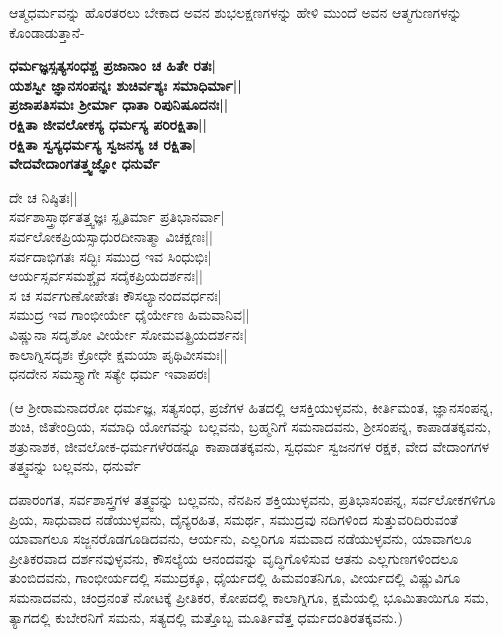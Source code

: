 ಆತ್ಮಧರ್ಮವನ್ನು ಹೊರತರಲು ಬೇಕಾದ ಅವನ ಶುಭಲಕ್ಷಣಗಳನ್ನು ಹೇಳಿ ಮುಂದೆ ಅವನ ಆತ್ಮಗುಣಗಳನ್ನು ಕೊಂಡಾಡುತ್ತಾನೆ- 


\begin{center} 

{\bf ಧರ್ಮಜ್ಞಸ್ಸತ್ಯಸಂಧಶ್ಚ ಪ್ರಜಾನಾಂ ಚ ಹಿತೇ ರತಃ|\\ 

ಯಶಸ್ವೀ ಜ್ಞಾನಸಂಪನ್ನಃ ಶುಚಿರ್ವಶ್ಯಃ ಸಮಾಧಿರ್ಮಾ||\\ 

ಪ್ರಜಾಪತಿಸಮಃ ಶ್ರೀರ್ಮಾ ಧಾತಾ ರಿಪುನಿಷೂದನಃ||\\ 

ರಕ್ಷಿತಾ ಜೀವಲೋಕಸ್ಯ ಧರ್ಮಸ್ಯ ಪರಿರಕ್ಷಿತಾ||\\ 

ರಕ್ಷಿತಾ ಸ್ವಸ್ಯಧರ್ಮಸ್ಯ ಸ್ವಜನಸ್ಯ ಚ ರಕ್ಷಿತಾ|\\ 

ವೇದವೇದಾಂಗತತ್ತ್ವಜ್ಞೋ ಧನುರ್ವೆ

ದೇ ಚ ನಿಷ್ಠಿತಃ||\\ 

ಸರ್ವಶಾಸ್ತ್ರಾರ್ಥತತ್ತ್ವಜ್ಞಃ ಸ್ಪೃತಿರ್ಮಾ ಪ್ರತಿಭಾನರ್ವಾ|\\ 

ಸರ್ವಲೋಕಪ್ರಿಯಸ್ಸಾಧುರದೀನಾತ್ಮಾ ವಿಚಕ್ಷಣಃ||\\ 

ಸರ್ವದಾಭಿಗತಃ ಸದ್ಭಿಃ ಸಮುದ್ರ ಇವ ಸಿಂಧುಭಿಃ|\\ 

ಆರ್ಯಸ್ಸರ್ವಸಮಶ್ಚೈವ ಸದೈಕಪ್ರಿಯದರ್ಶನಃ||\\ 

ಸ ಚ ಸರ್ವಗುಣೋಪೇತಃ ಕೌಸಲ್ಯಾನಂದವರ್ಧನಃ|\\ 

ಸಮುದ್ರ ಇವ ಗಾಂಭೀರ್ಯೇ ಧೈರ್ಯೇಣ ಹಿಮವಾನಿವ||\\ 

ವಿಷ್ಣುನಾ ಸದೃಶೋ ವೀರ್ಯೇ ಸೋಮವತ್ಪ್ರಿಯದರ್ಶನಃ|\\ 

ಕಾಲಾಗ್ನಿಸದೃಶಃ ಕ್ರೋಧೇ ಕ್ಷಮಯಾ ಪೃಥಿವೀಸಮಃ||\\ 

ಧನದೇನ ಸಮಸ್ತ್ಯಾಗೇ ಸತ್ಯೇ ಧರ್ಮ ಇವಾಪರಃ|} 

\end{center} 


(ಆ ಶ್ರೀರಾಮನಾದರೋ ಧರ್ಮಜ್ಞ, ಸತ್ಯಸಂಧ, ಪ್ರಜೆಗಳ ಹಿತದಲ್ಲಿ ಆಸಕ್ತಿಯುಳ್ಳವನು, ಕೀರ್ತಿಮಂತ, ಜ್ಞಾನಸಂಪನ್ನ, ಶುಚಿ, ಜಿತೇಂದ್ರಿಯ, ಸಮಾಧಿ ಯೋಗವನ್ನು ಬಲ್ಲವನು, ಬ್ರಹ್ಮನಿಗೆ ಸಮನಾದವನು, ಶ್ರೀಸಂಪನ್ನ, ಕಾಪಾಡತಕ್ಕವನು, ಶತ್ರುನಾಶಕ, ಜೀವಲೋಕ-ಧರ್ಮಗಳೆರಡನ್ನೂ ಕಾಪಾಡತಕ್ಕವನು, ಸ್ವಧರ್ಮ ಸ್ವಜನಗಳ ರಕ್ಷಕ, ವೇದ ವೇದಾಂಗಗಳ ತತ್ತ್ವವನ್ನು ಬಲ್ಲವನು, ಧನುರ್ವೆ

ದಪಾರಂಗತ, ಸರ್ವಶಾಸ್ತ್ರಗಳ ತತ್ತ್ವವನ್ನು ಬಲ್ಲವನು, ನೆನಪಿನ ಶಕ್ತಿಯುಳ್ಳವನು, ಪ್ರತಿಭಾಸಂಪನ್ನ, ಸರ್ವಲೋಕಗಳಿಗೂ ಪ್ರಿಯ, ಸಾಧುವಾದ ನಡೆಯುಳ್ಳವನು, ದೈನ್ಯರಹಿತ, ಸಮರ್ಥ, ಸಮುದ್ರವು ನದಿಗಳಿಂದ ಸುತ್ತುವರಿದಿರುವಂತೆ ಯಾವಾಗಲೂ ಸಜ್ಜನರೊಡಗೂಡಿದವನು, ಆರ್ಯನು, ಎಲ್ಲರಿಗೂ ಸಮವಾದ ನಡೆಯುಳ್ಳವನು, ಯಾವಾಗಲೂ ಪ್ರೀತಿಕರವಾದ ದರ್ಶನವುಳ್ಳವನು, ಕೌಸಲ್ಯೆಯ ಆನಂದವನ್ನು ವೃದ್ಧಿಗೊಳಿಸುವ ಆತನು ಎಲ್ಲಗುಣಗಳಿಂದಲೂ ತುಂಬಿದವನು, ಗಾಂಭೀರ್ಯದಲ್ಲಿ ಸಮುದ್ರಕ್ಕೂ, ಧೈರ್ಯದಲ್ಲಿ ಹಿಮವಂತನಿಗೂ, ವೀರ್ಯದಲ್ಲಿ ವಿಷ್ಣುವಿಗೂ ಸಮನಾದವನು, ಚಂದ್ರನಂತೆ ನೋಟಕ್ಕೆ ಪ್ರೀತಿಕರ, ಕೋಪದಲ್ಲಿ ಕಾಲಾಗ್ನಿಗೂ, ಕ್ಷಮೆಯಲ್ಲಿ ಭೂಮಿತಾಯಿಗೂ ಸಮ, ತ್ಯಾಗದಲ್ಲಿ ಕುಬೇರನಿಗೆ ಸಮನು, ಸತ್ಯದಲ್ಲಿ ಮತ್ತೊಬ್ಬ ಮೂರ್ತಿವೆತ್ತ ಧರ್ಮದಂತಿರತಕ್ಕವನು.) 


